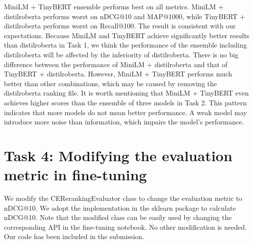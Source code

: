 \documentclass[acmsmall]{acmart}
\begin{document}
MiniLM + TinyBERT ensemble performs best on all metrics. MiniLM + distilroberta performs worst on nDCG@10 and MAP@1000, while TinyBERT + distilroberta performs worst on Recall@100. The result is consistent with our expectations. Because MiniLM and TinyBERT achieve significantly better results than distilroberta in Task 1, we think the performance of the ensemble including distilroberta will be affected by the inferiority of distilroberta. There is no big difference between the performance of MiniLM + distilroberta and that of TinyBERT + distilroberta. However, MiniLM + TinyBERT performs much better than other combinations, which may be caused by removing the distilroberta ranking file. It is worth mentioning that MiniLM + TinyBERT even achieves higher scores than the ensemble of three models in Task 2. This pattern indicates that more models do not mean better performance. A weak model may introduce more noise than information, which impairs the model's performance.

\section{Task 4: Modifying the evaluation metric in fine-tuning}
We modify the CERerankingEvaluator class to change the evaluation metric to nDCG@10. We adopt the implementation in the sklearn package to calculate nDCG@10. Note that the modified class can be easily used by changing the corresponding API in the fine-tuning notebook. No other modification is needed. Our code has been included in the submission.
\end{document}
